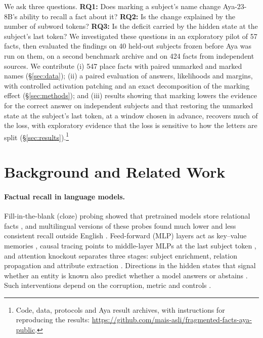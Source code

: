 \documentclass[11pt]{article}
\begin{document}
We ask three questions. \textbf{RQ1:} Does marking a subject's name change
Aya-23-8B's ability to recall a fact about it? \textbf{RQ2:} Is the change
explained by the number of subword tokens? \textbf{RQ3:} Is the deficit carried
by the hidden state at the subject's last token? We investigated these questions in an exploratory pilot of 57 facts,
then evaluated the findings on 40 held-out subjects frozen before Aya was run on
them, on a second benchmark archive and on 424 facts from independent
sources. We contribute (i) 547 place facts with paired unmarked and
marked names (\S\ref{sec:data}); (ii) a paired evaluation of answers,
likelihoods and margins, with controlled activation patching and an exact
decomposition of the marking effect (\S\ref{sec:methods}); and (iii) results
showing that marking lowers the evidence for the correct answer on independent
subjects and that restoring the unmarked state at the subject's last token, at a
window chosen in advance, recovers much of the loss, with exploratory evidence that the loss is
sensitive to how the letters are split
(\S\ref{sec:results}).\footnote{Code, data, protocols and Aya result archives,
with instructions for reproducing the results:
\url{https://github.com/mais-asli/fragmented-facts-aya-public}.}

\section{Background and Related Work}
\label{sec:related}

\paragraph{Factual recall in language models.}
Fill-in-the-blank (cloze) probing showed that pretrained models store relational facts
\citep{petroni-etal-2019-language}, and multilingual versions of these probes
found much lower and less consistent recall outside English
\citep{jiang-etal-2020-x,kassner-etal-2021-multilingual,qi-etal-2023-cross}.
Feed-forward (MLP) layers act as key--value memories \citep{geva-etal-2021-transformer}, causal
tracing points to middle-layer MLPs at the last subject token
\citep{meng-etal-2022-locating}, and attention knockout separates three stages:
subject enrichment, relation propagation and attribute extraction
\citep{geva-etal-2023-dissecting}. Directions in the hidden states that signal
whether an entity is known also predict whether a model answers or abstains
\citep{ferrando-etal-2025-know}. Such interventions \citep{vig-etal-2020-causal}
depend on the corruption, metric and controls
\citep{zhang-nanda-2024-best,heimersheim-nanda-2024-patching}.
\end{document}
